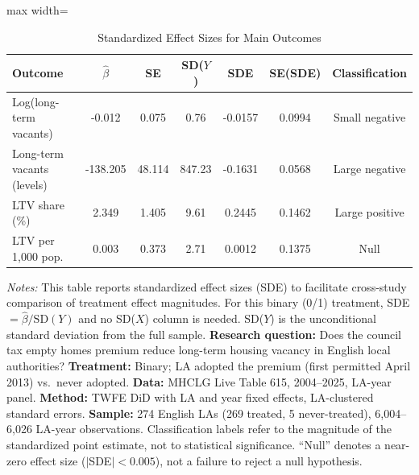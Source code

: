 \begin{table}[H]
\centering
\caption{Standardized Effect Sizes for Main Outcomes}
\label{tab:sde}
\begin{adjustbox}{max width=\textwidth}
\begin{tabular}{lcccccc}
\toprule
Outcome & $\hat{\beta}$ & SE & SD($Y$) & SDE & SE(SDE) & Classification \\
\midrule
Log(long-term vacants) & -0.012 & 0.075 & 0.76 & -0.0157 & 0.0994 & Small negative \\
Long-term vacants (levels) & -138.205 & 48.114 & 847.23 & -0.1631 & 0.0568 & Large negative \\
LTV share (\%) & 2.349 & 1.405 & 9.61 & 0.2445 & 0.1462 & Large positive \\
LTV per 1,000 pop. & 0.003 & 0.373 & 2.71 & 0.0012 & 0.1375 & Null \\
\bottomrule
\end{tabular}
\end{adjustbox}
\par\vspace{0.3em}
{\footnotesize \emph{Notes:} This table reports standardized effect sizes (SDE) to facilitate cross-study comparison of treatment effect magnitudes. For this binary (0/1) treatment, SDE $= \hat{\beta} / \text{SD}(Y)$ and no SD($X$) column is needed. SD($Y$) is the unconditional standard deviation from the full sample. \textbf{Research question:} Does the council tax empty homes premium reduce long-term housing vacancy in English local authorities? \textbf{Treatment:} Binary; LA adopted the premium (first permitted April 2013) vs.\ never adopted. \textbf{Data:} MHCLG Live Table 615, 2004--2025, LA-year panel. \textbf{Method:} TWFE DiD with LA and year fixed effects, LA-clustered standard errors. \textbf{Sample:} 274 English LAs (269 treated, 5 never-treated), 6,004--6,026 LA-year observations. Classification labels refer to the magnitude of the standardized point estimate, not to statistical significance. ``Null'' denotes a near-zero effect size ($|$SDE$| < 0.005$), not a failure to reject a null hypothesis.}
\end{table}

